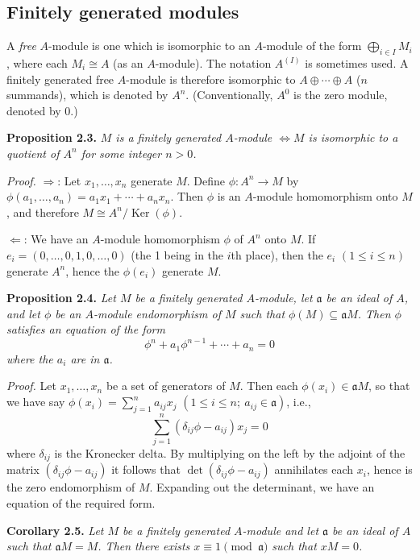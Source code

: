 \subsection{Finitely generated modules}

A \emph{free} \(A\)-module is one which is isomorphic to an \(A\)-module of the form \(\bigoplus_{i\in I}M_i\), where each \(M_i\cong A\) (as an \(A\)-module). The notation \(A^{(I)}\) is sometimes used. A finitely generated free \(A\)-module is therefore isomorphic to \(A\oplus\cdots\oplus A\) (\(n\) summands), which is denoted by \(A^n\). (Conventionally, \(A^0\) is the zero module, denoted by 0.)

\noindent\textbf{Proposition 2.3.} \emph{\(M\) is a finitely generated \(A\)-module \(\Longleftrightarrow M\) is isomorphic to a quotient of \(A^n\) for some integer \(n>0\).}

\noindent\emph{Proof.} \(\Rightarrow\): Let \(x_1,\ldots,x_n\) generate \(M\). Define \(\phi:A^n\to M\) by \(\phi(a_1,\ldots,a_n)=a_1x_1+\cdots+a_nx_n\). Then \(\phi\) is an \(A\)-module homomorphism onto \(M\), and therefore \(M\cong A^n/\operatorname{Ker}(\phi)\).

\(\Leftarrow\): We have an \(A\)-module homomorphism \(\phi\) of \(A^n\) onto \(M\). If \(e_i=(0,\ldots,0,1,0,\ldots,0)\) (the 1 being in the \(i\)th place), then the \(e_i\) \((1\leq i\leq n)\) generate \(A^n\), hence the \(\phi(e_i)\) generate \(M\). \proofbox

\noindent\textbf{Proposition 2.4.} \emph{Let \(M\) be a finitely generated \(A\)-module, let \(\mathfrak a\) be an ideal of \(A\), and let \(\phi\) be an \(A\)-module endomorphism of \(M\) such that \(\phi(M)\subseteq\mathfrak aM\). Then \(\phi\) satisfies an equation of the form}
\[
\phi^n+a_1\phi^{n-1}+\cdots+a_n=0
\]
\emph{where the \(a_i\) are in \(\mathfrak a\).}

\noindent\emph{Proof.} Let \(x_1,\ldots,x_n\) be a set of generators of \(M\). Then each \(\phi(x_i)\in\mathfrak aM\), so that we have say \(\phi(x_i)=\sum_{j=1}^n a_{ij}x_j\) \((1\leq i\leq n;\ a_{ij}\in\mathfrak a)\), i.e.,
\[
\sum_{j=1}^n(\delta_{ij}\phi-a_{ij})x_j=0
\]
where \(\delta_{ij}\) is the Kronecker delta. By multiplying on the left by the adjoint of the matrix \((\delta_{ij}\phi-a_{ij})\) it follows that \(\det(\delta_{ij}\phi-a_{ij})\) annihilates each \(x_i\), hence is the zero endomorphism of \(M\). Expanding out the determinant, we have an equation of the required form. \proofbox

\noindent\textbf{Corollary 2.5.} \emph{Let \(M\) be a finitely generated \(A\)-module and let \(\mathfrak a\) be an ideal of \(A\) such that \(\mathfrak aM=M\). Then there exists \(x\equiv1\pmod{\mathfrak a}\) such that \(xM=0\).}

